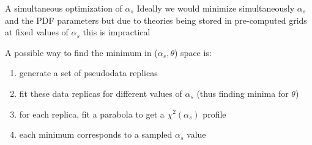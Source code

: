 \documentclass[8pt,t]{beamer}
\begin{document}
\begin{frame}{A simultaneous optimization of $\alpha_s$}
  Ideally we would minimize simultaneously $\alpha_s$ and the PDF parameters but due to theories being stored in pre-computed grids at fixed values of $\alpha_s$ this is impractical


  \vspace*{1em}

  A possible way to find the minimum in ($\alpha_s, \theta$) space is:
  \begin{enumerate}
    \item generate a set of pseudodata replicas
    \item fit these data replicas for different values of $\alpha_s$ (thus finding minima for $\theta$)
    \item for each replica, fit a parabola to get a $\chi^2(\alpha_s)$ profile
    \item each minimum corresponds to a sampled $\alpha_s$ value
  \end{enumerate}

\end{frame}
\end{document}

